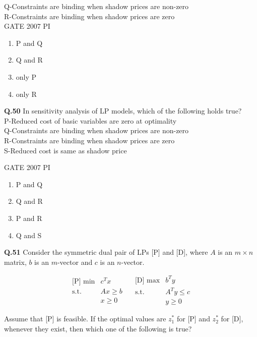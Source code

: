 \documentclass[journal,12pt,onecolumn]{exam}
\theoremstyle{remark}
\begin{document}
Q-Constraints are binding when shadow prices are non-zero \\

R-Constraints are binding when shadow prices are zero \\ 

\hfill{GATE 2007 PI}
\begin{enumerate}
    \item P and Q
    \item Q and R
    \item only P
    \item only R
\end{enumerate}
\noindent
\textbf{Q.50}
In sensitivity analysis of LP models, which of the following holds true?\\

P-Reduced cost of basic variables are zero at optimality\\

  Q-Constraints are binding when shadow prices are non-zero\\
  
  R-Constraints are binding when shadow prices are zero\\
  
  S-Reduced cost is same as shadow price

  \hfill{GATE 2007 PI}
  \begin{enumerate}
      \item P and Q
      \item Q and R
      \item P and R
      \item Q and S
  \end{enumerate}
  \noindent
  \textbf{Q.51}
  Consider the symmetric dual pair of LPs [P] and [D], where $A$ is an $m \times n$ matrix, 
$b$ is an $m$-vector and $c$ is an $n$-vector.

\[
\begin{array}{c|c}
\text{[P] } \min & c^T x \\ 
\text{s.t.} & Ax \ge b \\
& x \ge 0
\end{array}
\quad
\begin{array}{c|c}
\text{[D] } \max & b^T y \\ 
\text{s.t.} & A^T y \le c \\
& y \ge 0
\end{array}
\]

Assume that [P] is feasible. If the optimal values are $z_1^*$ for [P] and $z_2^*$ for [D], 
whenever they exist, then which one of the following is true?
\end{document}
